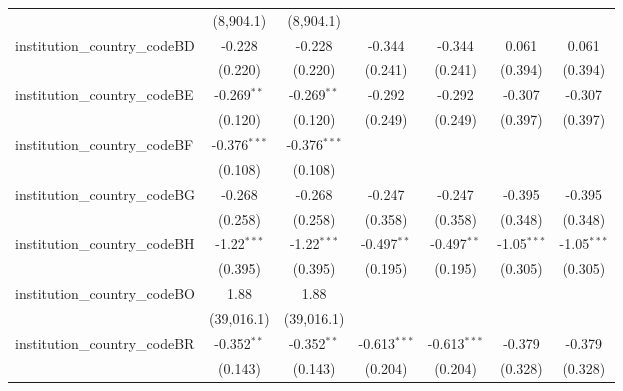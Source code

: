 \begin{tabular}{lcccccc}
                                         & (8,904.1)      & (8,904.1)      &                &                &                &   \\   
   institution\_country\_codeBD          & -0.228         & -0.228         & -0.344         & -0.344         & 0.061          & 0.061\\   
                                         & (0.220)        & (0.220)        & (0.241)        & (0.241)        & (0.394)        & (0.394)\\   
   institution\_country\_codeBE          & -0.269$^{**}$  & -0.269$^{**}$  & -0.292         & -0.292         & -0.307         & -0.307\\   
                                         & (0.120)        & (0.120)        & (0.249)        & (0.249)        & (0.397)        & (0.397)\\   
   institution\_country\_codeBF          & -0.376$^{***}$ & -0.376$^{***}$ &                &                &                &   \\   
                                         & (0.108)        & (0.108)        &                &                &                &   \\   
   institution\_country\_codeBG          & -0.268         & -0.268         & -0.247         & -0.247         & -0.395         & -0.395\\   
                                         & (0.258)        & (0.258)        & (0.358)        & (0.358)        & (0.348)        & (0.348)\\   
   institution\_country\_codeBH          & -1.22$^{***}$  & -1.22$^{***}$  & -0.497$^{**}$  & -0.497$^{**}$  & -1.05$^{***}$  & -1.05$^{***}$\\   
                                         & (0.395)        & (0.395)        & (0.195)        & (0.195)        & (0.305)        & (0.305)\\   
   institution\_country\_codeBO          & 1.88           & 1.88           &                &                &                &   \\   
                                         & (39,016.1)     & (39,016.1)     &                &                &                &   \\   
   institution\_country\_codeBR          & -0.352$^{**}$  & -0.352$^{**}$  & -0.613$^{***}$ & -0.613$^{***}$ & -0.379         & -0.379\\   
                                         & (0.143)        & (0.143)        & (0.204)        & (0.204)        & (0.328)        & (0.328)\\   

\end{tabular}
